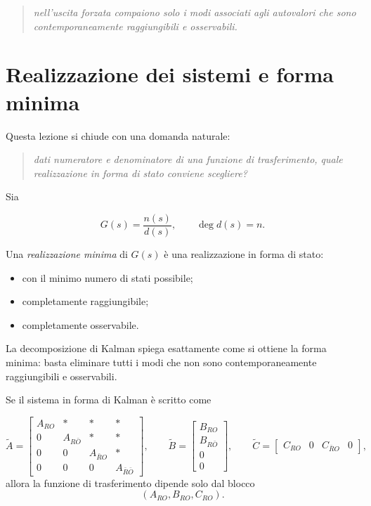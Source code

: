 \begin{quote}
\emph{nell'uscita forzata compaiono solo i modi associati agli autovalori che sono contemporaneamente raggiungibili e osservabili.}
\end{quote}

\bigskip

\section{Realizzazione dei sistemi e forma minima}

Questa lezione si chiude con una domanda naturale:

\begin{quote}
\emph{dati numeratore e denominatore di una funzione di trasferimento, quale realizzazione in forma di stato conviene scegliere?}
\end{quote}

Sia

\[
G(s)=\frac{n(s)}{d(s)},
\qquad
\deg d(s)=n.
\]

Una \emph{realizzazione minima} di \(G(s)\) è una realizzazione in forma di stato:
\begin{itemize}
    \item con il minimo numero di stati possibile;
    \item completamente raggiungibile;
    \item completamente osservabile.
\end{itemize}

La decomposizione di Kalman spiega esattamente come si ottiene la forma minima: basta eliminare tutti i modi che non sono contemporaneamente raggiungibili e osservabili.

Se il sistema in forma di Kalman è scritto come

\[
\tilde A=
\begin{bmatrix}
A_{RO} & * & * & *\\
0 & A_{R\bar O} & * & *\\
0 & 0 & A_{\bar R O} & *\\
0 & 0 & 0 & A_{\bar R\bar O}
\end{bmatrix},
\qquad
\tilde B=
\begin{bmatrix}
B_{RO}\\
B_{R\bar O}\\
0\\
0
\end{bmatrix},
\qquad
\tilde C=
\begin{bmatrix}
C_{RO} & 0 & C_{\bar R O} & 0
\end{bmatrix},
\]
allora la funzione di trasferimento dipende solo dal blocco
\[
(A_{RO},B_{RO},C_{RO}).
\]

